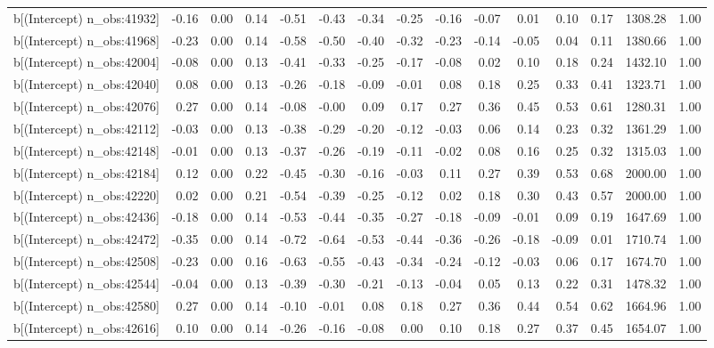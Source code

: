 \begin{table}[ht]
\begin{tabular}{rrrrrrrrrrrrrrr}
  b[(Intercept) n\_obs:41932] & -0.16 & 0.00 & 0.14 & -0.51 & -0.43 & -0.34 & -0.25 & -0.16 & -0.07 & 0.01 & 0.10 & 0.17 & 1308.28 & 1.00 \\ 
  b[(Intercept) n\_obs:41968] & -0.23 & 0.00 & 0.14 & -0.58 & -0.50 & -0.40 & -0.32 & -0.23 & -0.14 & -0.05 & 0.04 & 0.11 & 1380.66 & 1.00 \\ 
  b[(Intercept) n\_obs:42004] & -0.08 & 0.00 & 0.13 & -0.41 & -0.33 & -0.25 & -0.17 & -0.08 & 0.02 & 0.10 & 0.18 & 0.24 & 1432.10 & 1.00 \\ 
  b[(Intercept) n\_obs:42040] & 0.08 & 0.00 & 0.13 & -0.26 & -0.18 & -0.09 & -0.01 & 0.08 & 0.18 & 0.25 & 0.33 & 0.41 & 1323.71 & 1.00 \\ 
  b[(Intercept) n\_obs:42076] & 0.27 & 0.00 & 0.14 & -0.08 & -0.00 & 0.09 & 0.17 & 0.27 & 0.36 & 0.45 & 0.53 & 0.61 & 1280.31 & 1.00 \\ 
  b[(Intercept) n\_obs:42112] & -0.03 & 0.00 & 0.13 & -0.38 & -0.29 & -0.20 & -0.12 & -0.03 & 0.06 & 0.14 & 0.23 & 0.32 & 1361.29 & 1.00 \\ 
  b[(Intercept) n\_obs:42148] & -0.01 & 0.00 & 0.13 & -0.37 & -0.26 & -0.19 & -0.11 & -0.02 & 0.08 & 0.16 & 0.25 & 0.32 & 1315.03 & 1.00 \\ 
  b[(Intercept) n\_obs:42184] & 0.12 & 0.00 & 0.22 & -0.45 & -0.30 & -0.16 & -0.03 & 0.11 & 0.27 & 0.39 & 0.53 & 0.68 & 2000.00 & 1.00 \\ 
  b[(Intercept) n\_obs:42220] & 0.02 & 0.00 & 0.21 & -0.54 & -0.39 & -0.25 & -0.12 & 0.02 & 0.18 & 0.30 & 0.43 & 0.57 & 2000.00 & 1.00 \\ 
  b[(Intercept) n\_obs:42436] & -0.18 & 0.00 & 0.14 & -0.53 & -0.44 & -0.35 & -0.27 & -0.18 & -0.09 & -0.01 & 0.09 & 0.19 & 1647.69 & 1.00 \\ 
  b[(Intercept) n\_obs:42472] & -0.35 & 0.00 & 0.14 & -0.72 & -0.64 & -0.53 & -0.44 & -0.36 & -0.26 & -0.18 & -0.09 & 0.01 & 1710.74 & 1.00 \\ 
  b[(Intercept) n\_obs:42508] & -0.23 & 0.00 & 0.16 & -0.63 & -0.55 & -0.43 & -0.34 & -0.24 & -0.12 & -0.03 & 0.06 & 0.17 & 1674.70 & 1.00 \\ 
  b[(Intercept) n\_obs:42544] & -0.04 & 0.00 & 0.13 & -0.39 & -0.30 & -0.21 & -0.13 & -0.04 & 0.05 & 0.13 & 0.22 & 0.31 & 1478.32 & 1.00 \\ 
  b[(Intercept) n\_obs:42580] & 0.27 & 0.00 & 0.14 & -0.10 & -0.01 & 0.08 & 0.18 & 0.27 & 0.36 & 0.44 & 0.54 & 0.62 & 1664.96 & 1.00 \\ 
  b[(Intercept) n\_obs:42616] & 0.10 & 0.00 & 0.14 & -0.26 & -0.16 & -0.08 & 0.00 & 0.10 & 0.18 & 0.27 & 0.37 & 0.45 & 1654.07 & 1.00 \\ 

\end{tabular}
\end{table}
